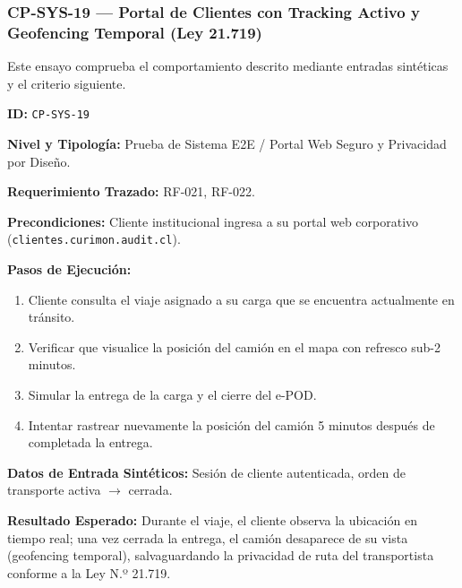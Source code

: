 \subsubsection*{CP-SYS-19 — Portal de Clientes con Tracking Activo y Geofencing Temporal (Ley 21.719)}\label{sec:9-cp-sys-19}
Este ensayo comprueba el comportamiento descrito mediante entradas sintéticas y el criterio siguiente.

\par\noindent\textbf{ID:} \texttt{C\allowbreak{}P\allowbreak{}-\allowbreak{}S\allowbreak{}Y\allowbreak{}S\allowbreak{}-\allowbreak{}1\allowbreak{}9\allowbreak{}}\par
\par\noindent\textbf{Nivel y Tipología:} Prueba de Sistema E2E / Portal Web Seguro y Privacidad por Diseño.\par
\par\noindent\textbf{Requerimiento Trazado:} RF-021, RF-022.\par
\par\noindent\textbf{Precondiciones:} Cliente institucional ingresa a su portal web corporativo (\texttt{c\allowbreak{}l\allowbreak{}i\allowbreak{}e\allowbreak{}n\allowbreak{}t\allowbreak{}e\allowbreak{}s\allowbreak{}.\allowbreak{}c\allowbreak{}u\allowbreak{}r\allowbreak{}i\allowbreak{}m\allowbreak{}o\allowbreak{}n\allowbreak{}.\allowbreak{}a\allowbreak{}u\allowbreak{}d\allowbreak{}i\allowbreak{}t\allowbreak{}.\allowbreak{}c\allowbreak{}l\allowbreak{}}).\par
\par\noindent\textbf{Pasos de Ejecución:} \par
\begin{enumerate}
\item Cliente consulta el viaje asignado a su carga que se encuentra actualmente en tránsito.
\item Verificar que visualice la posición del camión en el mapa con refresco sub-2 minutos.
\item Simular la entrega de la carga y el cierre del e-POD.
\item Intentar rastrear nuevamente la posición del camión 5 minutos después de completada la entrega.
\end{enumerate}
\par\noindent\textbf{Datos de Entrada Sintéticos:} Sesión de cliente autenticada, orden de transporte activa \(\rightarrow\) cerrada.\par
\par\noindent\textbf{Resultado Esperado:} Durante el viaje, el cliente observa la ubicación en tiempo real; una vez cerrada la entrega, el camión desaparece de su vista (geofencing temporal), salvaguardando la privacidad de ruta del transportista conforme a la Ley N.º 21.719.\par

